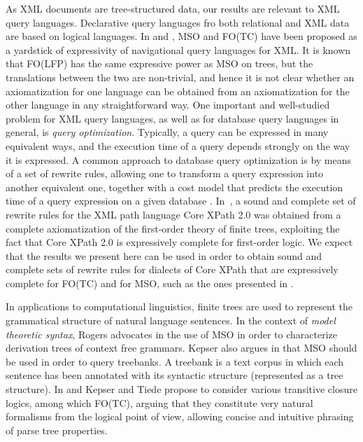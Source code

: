\documentclass{LMCS}
\newcommand{\xml}{\textsf{XML}\xspace}
\newcommand{\mso}{\textsf{MSO}\xspace}
\newcommand{\fotc}{\textsf{FO(TC)}\xspace}
\newcommand{\folfp}{\textsf{FO(LFP)}\xspace}
\begin{document}
As \xml documents are tree-structured data, our results are
relevant to \xml query languages. Declarative query languages fro both relational and \xml data are
based on logical languages. In \cite{1376952} and \cite{GottlobKoch},
\mso and \fotc have been proposed as a yardstick of expressivity
of navigational query languages for \xml. It is known that \folfp has the same
expressive power as \mso on trees, but the translations between
the two are non-trivial, and hence it is not clear whether an
axiomatization for one language can be obtained from an
axiomatization for the other language in any straightforward way.
One important and well-studied problem for XML query languages, as well as for
database query languages in general,  is
\emph{query optimization}. Typically, a query can be expressed in many
equivalent ways, and the execution time of a query depends strongly on
the way it is expressed. A common approach to database query optimization is
by means of a set of rewrite rules, allowing one to
transform a query expression into another equivalent one, together with
a cost model that predicts the execution time of a query expression on
a given database \cite{DBLP:books/aw/AbiteboulHV95}.
 In~\cite{CateMarxXPath20}, a sound and complete set of
rewrite rules for the XML path language Core XPath 2.0 was obtained
from a complete axiomatization of the first-order theory of finite trees,
exploiting the fact that Core XPath 2.0 is expressively complete for
first-order logic. We expect that the results we present here can be
used in order to obtain sound and complete sets of rewrite rules for
dialects of Core XPath that are expressively complete for \fotc and for
\mso, such as the ones presented in \cite{TenCate2006,1376952}.

In applications to computational linguistics, finite trees are
used to represent the grammatical structure of natural language
sentences. In the context of \emph{model theoretic syntax}, Rogers
advocates in \cite{521965} the use of \mso in order to
characterize derivation trees of context free grammars. Kepser
also argues in \cite{1047003} that \mso should be used
in order to query treebanks. A treebank is a text corpus in which
each sentence has been annotated with its syntactic structure
(represented as a tree structure). In \cite{2006} and \cite{1219706} Kepser and
Tiede propose to consider various transitive closure logics,
among which \fotc, arguing that they constitute very natural
formalisms from the logical point of view, allowing concise and intuitive phrasing of parse tree properties.\\
\end{document}
